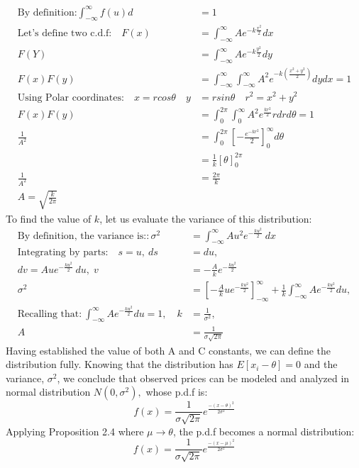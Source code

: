 \documentclass[12pt]{article}
\theoremstyle{plain}
\theoremstyle{definition}
\numberwithin{equation}{section}
\begin{document}
\begin{align}
\text{By definition:} \int^\infty_ {-\infty}f(u)d &= 1\\
\text{Let's define two c.d.f:}\quad F(x) &=\int^\infty_ {-\infty} A e^{-k\frac{x^2}{2}} dx\\
F(Y) &= \int^\infty_ {-\infty} A e^{-k\frac{y^2}{2}} dy\\
F(x)F(y) &= \int^\infty_ {-\infty}\int^\infty_ {-\infty} A^2 e^{-k(\frac{x^2+y^2}{2})} dydx = 1\\
\text{Using Polar coordinates:} \quad x=rcos\theta \quad y &=rsin\theta \quad r^2 = x^2 + y^2 \\
F(x) F(y) &= \int^{2\pi}_0 \int^{\infty}_0 A^2 e^{\frac{kr^2}{2}} rdrd\theta = 1 \\
\frac{1}{A^2} &= \int^{2\pi}_0 \left[-\frac{e^{-kr^2}}{2}\right]^{\infty}_0 d\theta\\
&= \frac{1}{k}[\theta]^{2\pi}_0\\
\frac{1}{A^2} &= \frac{2\pi}{k} \\
A = \sqrt{\frac{k}{2\pi}}
\end{align}
To find the value of $k$, let us evaluate the variance of this distribution:
\begin{align}
\text{By definition, the variance is:}: \sigma^2 &= \int^{\infty}_{-\infty} A u^2e^{-\frac{ku^2}{2}} \ dx\\
\text{Integrating by parts:}\quad s = u, \ ds &= du, \quad  \\
dv = Aue^{-\frac{ku^2}{2}} \ du,  \; v &= -\frac{A}{k}e^{-\frac{ku^2}{2}}\\
\sigma^2 &= \left[ -\frac{A}{k}ue^{-\frac{ku^2}{2}}  \right]^{\infty}_{-\infty} + \frac{1}{k}\int^{\infty}_{-\infty}Ae^{-\frac{ku^2}{2}} du, \\ 
\text{Recalling that:}\ \int^{\infty}_{-\infty}Ae^{-\frac{ku^2}{2}} du =1, \quad
k &=\frac{1}{\sigma^2}, \\
A &= \frac{1}{\sigma \sqrt{2 \pi}}
\end{align}
Having established the value of both A and C constants, we can define the distribution fully. Knowing that the distribution has $E[x_i - \theta] = 0$ and the variance, $\sigma^2$, we conclude that observed prices can be modeled and analyzed in normal distribution $N(0, \sigma^2),$ whose p.d.f is:
\begin{equation}
f(x) = \frac{1}{\sigma \sqrt{2\pi}}e^{\frac{-(x - \theta)^{2}}{2\sigma^2}}
 \end{equation}
Applying  Proposition 2.4 where $\mu \rightarrow \theta$, the p.d.f becomes a normal distribution:
\begin{equation}
f(x) = \frac{1}{\sigma \sqrt{2\pi}}e^{\frac{-(x - \mu)^{2}}{2\sigma^2}}
\end{equation}
\end{document}
